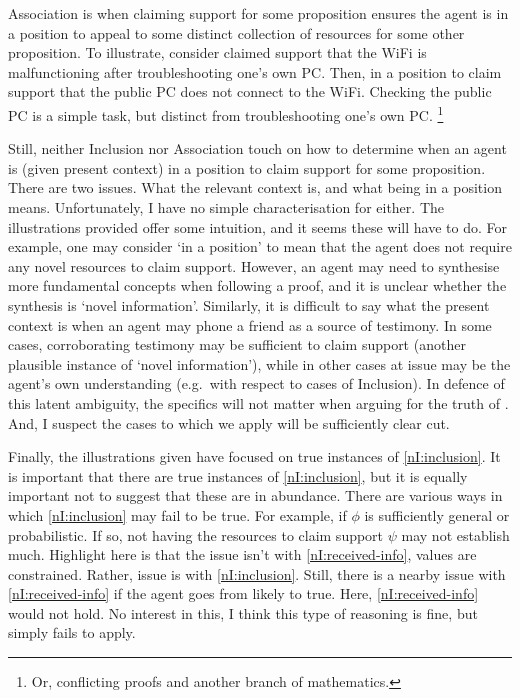 \begin{note}
  Association is when claiming support for some proposition ensures the agent is in a position to appeal to some distinct collection of resources for some other proposition.
  To illustrate, consider claimed support that the WiFi is malfunctioning after troubleshooting one's own PC.
  Then, in a position to claim support that the public PC does not connect to the WiFi.
  Checking the public PC is a simple task, but distinct from troubleshooting one's own PC.\nolinebreak
  \footnote{
    Or, conflicting proofs and another branch of mathematics.
  }

  Still, neither Inclusion nor Association touch on how to determine when an agent is (given present context) in a position to claim support for some proposition.
  There are two issues.
  What the relevant context is, and what being in a position means.
  Unfortunately, I have no simple characterisation for either.
  The illustrations provided offer some intuition, and it seems these will have to do.
  For example, one may consider `in a position' to mean that the agent does not require any novel resources to claim support.
  However, an agent may need to synthesise more fundamental concepts when following a proof, and it is unclear whether the synthesis is `novel information'.
  Similarly, it is difficult to say what the present context is when an agent may phone a friend as a source of testimony.
  In some cases, corroborating testimony may be sufficient to claim support (another plausible instance of `novel information'), while in other cases at issue may be the agent's own understanding (e.g.\ with respect to cases of Inclusion).
  In defence of this latent ambiguity, the specifics will not matter when arguing for the truth of \nI{}.
  And, I suspect the cases to which we apply \nI{} will be sufficiently clear cut.

  Finally, the illustrations given have focused on true instances of \ref{nI:inclusion}.
  It is important that there are true instances of \ref{nI:inclusion}, but it is equally important not to suggest that these are in abundance.
  There are various ways in which \ref{nI:inclusion} may fail to be true.
  For example, if \(\phi\) is sufficiently general or probabilistic.
  If so, not having the resources to claim support \(\psi\) may not establish much.
  Highlight here is that the issue isn't with \ref{nI:received-info}, values are constrained.
  Rather, issue is with \ref{nI:inclusion}.
  Still, there is a nearby issue with \ref{nI:received-info} if the agent goes from likely to true.
  Here, \ref{nI:received-info} would not hold.
  No interest in this, I think this type of reasoning is fine, but \nI{} simply fails to apply.
\end{note}

